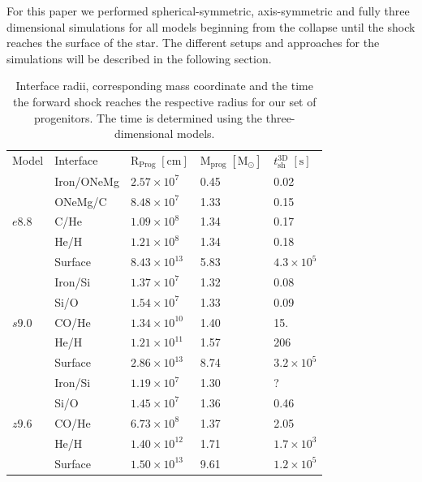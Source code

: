 \documentclass[fleqn,usenatbib]{mnras}
\begin{document}
For this paper we performed spherical-symmetric, axis-symmetric and fully three dimensional simulations for all models beginning from the collapse until the shock reaches the surface of the star. The different setups and approaches for the simulations will be described in the following section.


\begin{table}
   \begin{tabular}{l l l l l} 
   \hline
     Model      &Interface & $\mathrm{R_{Prog}\;[cm]}$ & $\mathrm{M_{prog}\;[M_{\odot}]}$ & $t_{\mathrm{sh}}^{\mathrm{3D}}\;\mathrm{[s]}$\\ [0.5ex] 
   \multirow{5}{*}{$e8.8$} & Iron/ONeMg & $2.57\times 10^{7}$  & 0.45 & 0.02 \\ 
                           & ONeMg/C    & $8.48\times 10^{7}$  & 1.33 & 0.15 \\
                           & C/He       & $1.09\times 10^{8}$  & 1.34 & 0.17 \\
                           & He/H       & $1.21\times 10^{8}$  & 1.34 & 0.18\\
                           & Surface    & $8.43\times 10^{13}$ & 5.83 & $4.3\times10^5$\\
   \hline
   \multirow{5}{*}{$s9.0$} & Iron/Si    & $1.37\times 10^{7}$   & 1.32 & 0.08 \\ 
                           & Si/O       & $1.54\times 10^{7}$   & 1.33 & 0.09 \\ 
                           & CO/He      & $1.34\times 10^{10}$  & 1.40 & 15. \\
                           & He/H       & $1.21\times 10^{11}$  & 1.57 & 206 \\
                           & Surface    & $2.86\times 10^{13}$  & 8.74 & $3.2\times 10^5$ \\
   \hline
   \multirow{5}{*}{$z9.6$} & Iron/Si    & $1.19\times 10^{7}$  & 1.30 & ?\\ 
                           & Si/O       & $1.45\times 10^{7}$  & 1.36 & 0.46\\ 
                           & CO/He      & $6.73\times 10^{8}$  & 1.37 & 2.05\\
                           & He/H       & $1.40\times 10^{12}$ & 1.71 & $1.7\times10^{3}$\\
                           & Surface    & $1.50\times 10^{13}$ & 9.61 & $1.2\times10^5$  \\
   \end{tabular}
   \caption{Interface radii, corresponding mass coordinate and the time the forward shock reaches the respective radius for our set of progenitors. The time is determined using the three-dimensional models.}
   \label{tab:progenitors}
\end{table}
\end{document}
